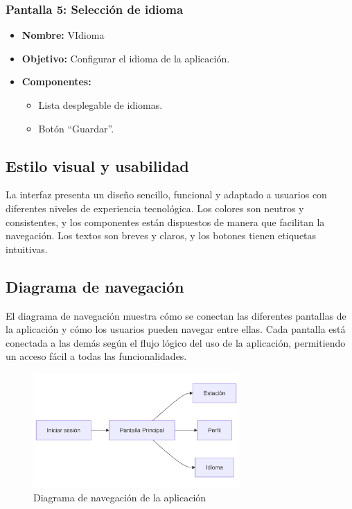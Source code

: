     \subsubsection{Pantalla 5: Selección de idioma}
    \begin{itemize}
        \item \textbf{Nombre:} VIdioma
        \item \textbf{Objetivo:} Configurar el idioma de la aplicación.
        \item \textbf{Componentes:}
        \begin{itemize}
            \item Lista desplegable de idiomas.
            \item Botón ``Guardar''.
        \end{itemize}
    \end{itemize}

    \subsection{Estilo visual y usabilidad}

    La interfaz presenta un diseño sencillo, funcional y adaptado a usuarios con diferentes niveles de experiencia tecnológica. Los colores son neutros y consistentes, y los componentes están dispuestos de manera que facilitan la navegación. Los textos son breves y claros, y los botones tienen etiquetas intuitivas.

    \subsection{Diagrama de navegación}\label{subsec:diagrama-de-navegacion}
    El diagrama de navegación muestra cómo se conectan las diferentes pantallas de la aplicación y cómo los usuarios pueden navegar entre ellas. Cada pantalla está conectada a las demás según el flujo lógico del uso de la aplicación, permitiendo un acceso fácil a todas las funcionalidades.
    \begin{figure}[h!]
        \centering
        \includegraphics[width=0.7\textwidth]{imagenes/diagrama_navegacion.png}
        \caption{Diagrama de navegación de la aplicación}
        \label{fig:diagrama_navegacion}
    \end{figure}

